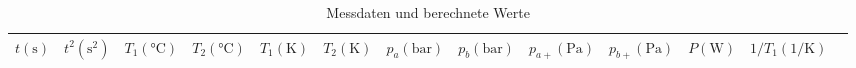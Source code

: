   \begin{table}
    \caption{Messdaten und berechnete Werte}
    \label{tab:some_data}
    \begin{tabular}{S[table-format=3.0] S S S S S S S S S S S S[table-format=3.2]}
      \toprule
      {$t (\unit{\second})$} &
      {$t^{2} (\unit{\second\squared})$}&
      {$T_{1} (\unit{\celsius})$}&
      {$T_{2} (\unit{\celsius})$}&
      {$T_{1} (\unit{\kelvin})$}&
      {$T_{2} (\unit{\kelvin})$}&
      {$p_{a} (\unit{\bar})$}&
      {$p_{b} (\unit{\bar})$}&
      {$p_{a+} (\unit{\pascal})$}&
      {$p_{b+} (\unit{\pascal})$}&
      {$P (\unit{\watt})$}&
      {$1/T_{1} (1/\unit{\kelvin})$}& \\
      \midrule
      

\end{tabular}
\end{table}
